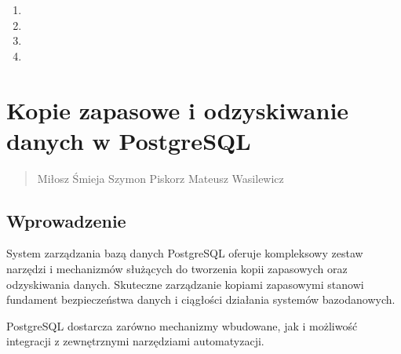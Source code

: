 \documentclass[a4paper,11pt,openany,english]{sphinxmanual}
\begin{document}
\begin{enumerate}
\item {} 
\sphinxAtStartPar
{}

\item {} 
\sphinxAtStartPar
{}

\item {} 
\sphinxAtStartPar
{}

\item {} 
\sphinxAtStartPar
{}

\end{enumerate}

\sphinxstepscope


\section{Kopie zapasowe i odzyskiwanie danych w PostgreSQL}
\label{\detokenize{rozdzial2/Kopie_zapasowe_i_odzyskiwanie_danych/kopie_zapasowe_i_odzyskiwanie_danych:kopie-zapasowe-i-odzyskiwanie-danych-w-postgresql}}\label{\detokenize{rozdzial2/Kopie_zapasowe_i_odzyskiwanie_danych/kopie_zapasowe_i_odzyskiwanie_danych::doc}}\begin{quote}\begin{description}
\sphinxAtStartPar
Miłosz Śmieja Szymon Piskorz Mateusz Wasilewicz

\end{description}\end{quote}


\subsection{Wprowadzenie}
\label{\detokenize{rozdzial2/Kopie_zapasowe_i_odzyskiwanie_danych/kopie_zapasowe_i_odzyskiwanie_danych:wprowadzenie}}
\sphinxAtStartPar
System zarządzania bazą danych PostgreSQL oferuje kompleksowy zestaw narzędzi i mechanizmów służących do tworzenia kopii zapasowych oraz odzyskiwania danych. Skuteczne zarządzanie kopiami zapasowymi stanowi fundament bezpieczeństwa danych i ciągłości działania systemów bazodanowych.

\sphinxAtStartPar
PostgreSQL dostarcza zarówno mechanizmy wbudowane, jak i możliwość integracji z zewnętrznymi narzędziami automatyzacji.
\end{document}
